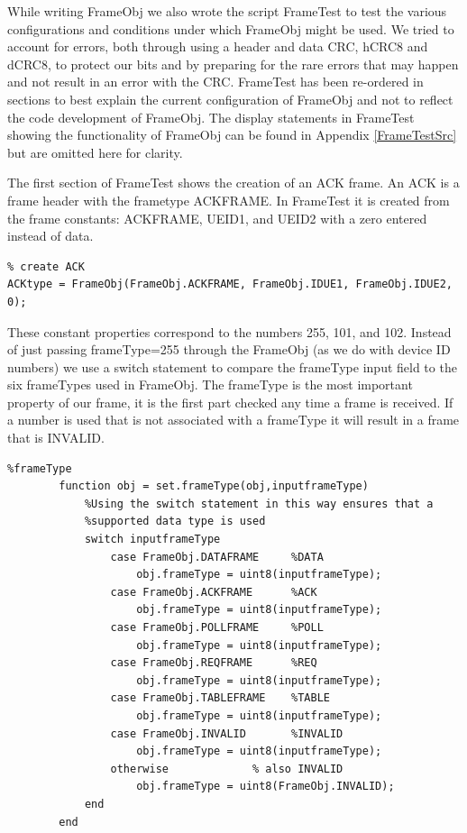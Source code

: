 While writing FrameObj we also wrote the script FrameTest to test the various configurations and conditions under which FrameObj might be used. We tried to account for errors, both through using a header and data CRC, hCRC8 and dCRC8, to protect our bits and by preparing for the rare errors that may happen and not result in an error with the CRC. FrameTest has been re-ordered in sections to best explain the current configuration of FrameObj and not to reflect the code development of FrameObj. The display statements in FrameTest showing the functionality of FrameObj can be found in Appendix \ref{FrameTestSrc} but are omitted here for clarity.

The first section of FrameTest shows the creation of an ACK frame. An ACK is a frame header with the frametype ACKFRAME. In FrameTest it is created from the frame constants: ACKFRAME, UEID1, and UEID2 with a zero entered instead of data.  
 
\begin{lstlisting}
% create ACK
ACKtype = FrameObj(FrameObj.ACKFRAME, FrameObj.IDUE1, FrameObj.IDUE2, 0);
\end{lstlisting}

These constant properties correspond to the numbers 255, 101, and 102. Instead of just passing frameType=255 through the FrameObj (as we do with device ID numbers) we use a switch statement to compare the frameType input field to the six frameTypes used in FrameObj. The frameType is the most important property of our frame, it is the first part checked any time a frame is received. If a number is used that is not associated with a frameType it will result in a frame that is INVALID.

\begin{lstlisting} 
%frameType
        function obj = set.frameType(obj,inputframeType)
            %Using the switch statement in this way ensures that a
            %supported data type is used
            switch inputframeType
                case FrameObj.DATAFRAME     %DATA
                    obj.frameType = uint8(inputframeType);
                case FrameObj.ACKFRAME      %ACK
                    obj.frameType = uint8(inputframeType);
                case FrameObj.POLLFRAME     %POLL
                    obj.frameType = uint8(inputframeType);
                case FrameObj.REQFRAME      %REQ
                    obj.frameType = uint8(inputframeType);
                case FrameObj.TABLEFRAME    %TABLE
                    obj.frameType = uint8(inputframeType);
                case FrameObj.INVALID       %INVALID
                    obj.frameType = uint8(inputframeType);
                otherwise             % also INVALID
                    obj.frameType = uint8(FrameObj.INVALID);
            end
        end
\end{lstlisting}

